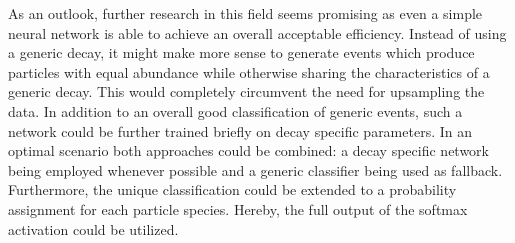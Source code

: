 As an outlook, further research in this field seems promising as even a simple neural network is able to achieve an overall acceptable efficiency. Instead of using a generic decay, it might make more sense to generate events which produce particles with equal abundance while otherwise sharing the characteristics of a generic decay. This would completely circumvent the need for upsampling the data. In addition to an overall good classification of generic events, such a network could be further trained briefly on decay specific parameters. In an optimal scenario both approaches could be combined: a decay specific network being employed whenever possible and a generic classifier being used as fallback. Furthermore, the unique classification could be extended to a probability assignment for each particle species. Hereby, the full output of the softmax activation could be utilized.
